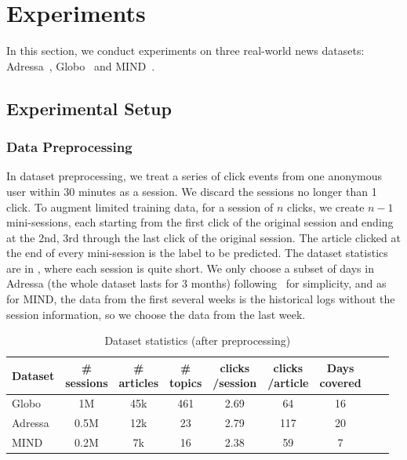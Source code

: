 \section{Experiments}
\label{sec:experiment}
In this section, we conduct experiments on three real-world news datasets: 
Adressa~\cite{gulla_adressa_2017}, Globo~\cite{moreira_news_2018} and MIND~\cite{wu2020mind}. 

\subsection{Experimental Setup}
\subsubsection{Data Preprocessing}
In dataset preprocessing, we treat a series of click events from one anonymous user 
within 30 minutes as a session. 
We discard the sessions no longer than 1 click.
To augment limited training data, for a session of $n$ clicks, we create $n-1$ mini-sessions, 
each starting from the first click of the original session and ending at the 2nd, 3rd through
the last click of the original session. The article clicked at the end of every mini-session is 
the label to be predicted. The dataset statistics are 
in , where each session is quite short. We only choose a subset of days 
in Adressa (the whole dataset lasts for 3 months) following~\citet{moreira_contextual_2019} 
for simplicity, and as for MIND, the data from the first several weeks is 
the historical logs without the session information, so we choose the data from the last week.

\begin{table}[th]\setlength{\tabcolsep}{2.7pt}
  \caption{Dataset statistics (after preprocessing)}
  \label{tb:dataset}
  \centering
  \begin{tabular}{l|cccccccc}
    \toprule
     Dataset & \tabincell{c}{\# \\sessions} & \tabincell{c}{\# \\articles} & \tabincell{c}{\# \\topics}&\tabincell{c}{clicks\\/session}  & \tabincell{c}{clicks\\/article} & \tabincell{c}{Days\\covered}\\
    \midrule
    Globo & 1M & 45k & 461 & 2.69 & 64 & 16 \\
    Adressa & 0.5M & 12k & 23 & 2.79 & 117 & 20 \\
    MIND & 0.2M & 7k & 16 & 2.38 & 59 & 7 \\
    \bottomrule
  \end{tabular}
\end{table}


